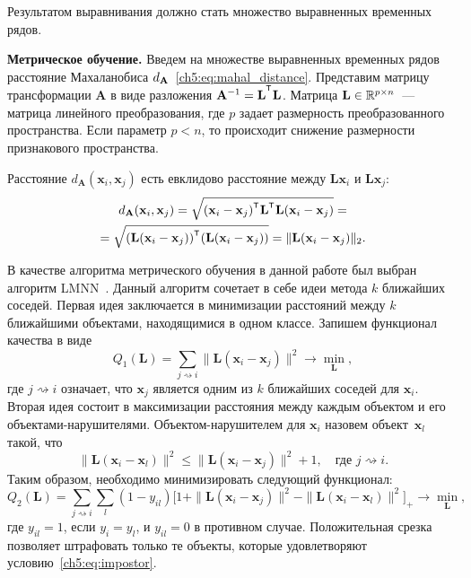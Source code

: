 Результатом выравнивания должно стать множество выравненных временных рядов.

\textbf{Метрическое обучение.}
Введем на множестве выравненных временных рядов расстояние Махаланобиса $d_{\mathbf{A}}$~\ref{ch5:eq:mahal_distance}.
Представим матрицу трансформации $\mathbf{A}$ в виде разложения $\mathbf{A}^{-1} = \mathbf{L}^{\T}  \mathbf{L}$.
Матрица $\mathbf{L} \in \mathbb{R}^{p \times n}$~--- матрица линейного преобразования, где $p$ задает размерность преобразованного пространства. Если параметр $p < n$, то происходит снижение размерности признакового пространства.

Расстояние $d_\mathbf{A} (\mathbf{x}_i, \mathbf{x}_j)$ есть евклидово расстояние между $\mathbf{Lx}_i$ и $\mathbf{Lx}_j$:
\begin{multline*}
	d_\mathbf{A} (\mathbf{x}_i, \mathbf{x}_j) = \sqrt{(\mathbf{x}_i - \mathbf{x}_j)^{\T} \mathbf{L}^{\T} \mathbf{L} (\mathbf{x}_i - \mathbf{x}_j)} = \\= \sqrt{(\mathbf{L} (\mathbf{x}_i - \mathbf{x}_j))^{\T} (\mathbf{L} (\mathbf{x}_i - \mathbf{x}_j))} = \|\mathbf{L} (\mathbf{x}_i - \mathbf{x}_j)\|_2.
\end{multline*}

В качестве алгоритма метрического обучения в данной работе был выбран алгоритм LMNN~\cite{weinberger2009distance}. 
Данный алгоритм сочетает в себе идеи метода $k$ ближайших соседей. 
Первая идея заключается в минимизации расстояний между $k$ ближайшими объектами, находящимися в одном классе. 
Запишем функционал качества в виде
\[
	Q_1(\mathbf{L}) = \sum_{j \rightsquigarrow i} \|\mathbf{L}(\mathbf{x}_i - \mathbf{x}_j)\|^2 \rightarrow \min_{\mathbf{L}},
\]
где $j \rightsquigarrow i$ означает, что $\mathbf{x}_j$ является одним из $k$ ближайших соседей для $\mathbf{x}_i$.
Вторая идея состоит в максимизации расстояния между каждым объектом и его объектами-нарушителями. Объектом-нарушителем для $\mathbf{x}_i$ назовем объект~$\mathbf{x}_l$ такой, что
\begin{equation}
	\label{ch5:eq:impostor}
	\|\mathbf{L}(\mathbf{x}_i - \mathbf{x}_l)\|^2 \leq \|\mathbf{L}(\mathbf{x}_i - \mathbf{x}_j)\|^2 + 1, \quad \text{где $j \rightsquigarrow i$}.
\end{equation}
Таким образом, необходимо минимизировать следующий функционал:
\[
	Q_2(\mathbf{L}) = \sum_{j \rightsquigarrow i} \sum_l(1 - y_{il})\bigl[1 + \|\mathbf{L}(\mathbf{x}_i - \mathbf{x}_j)\|^2 - \|\mathbf{L}(\mathbf{x}_i - \mathbf{x}_l)\|^2\bigr]_+ \rightarrow \min_{\mathbf{L}},
\]
где $y_{il} = 1$, если $y_i = y_l$, и $y_{il} = 0$ в противном случае.
Положительная срезка позволяет штрафовать только те объекты, которые удовлетворяют условию~\eqref{ch5:eq:impostor}.

